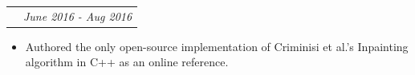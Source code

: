\documentclass[letterpaper,10pt]{article}
\makeatletter
\newcommand{\resitem}[1]{\item #1 \vspace{0pt}}
\newcommand{\ressubheading}[4]{
\begin{tabular*}{7in}{l@{\extracolsep{\fill}}r}
		\textbf{#1} #2 & \textit{#4} \\
\end{tabular*}\vspace{0pt}}
\newcommand{\resprojectsubheading}[2]{
\begin{tabular*}{7in}{l@{\extracolsep{\fill}}r}
        \textbf{#1} & \textit{#2} \\
\end{tabular*}\vspace{0pt}}
\newcommand{\MYhref}[3][blue]{\href{#2}{\color{#1}{\underline{#3}}}}%
\makeatother
\begin{document}


	




   \resprojectsubheading{\textbf{\MYhref{https://github.com/sooham/inpainting}{Image Inpainting C++ Library}}}{June 2016 - Aug 2016}
	\begin{itemize} \vspace{-\topsep}
    \setlength{\parskip}{0pt}
    \setlength{\itemsep}{0pt plus 1pt}

    \resitem{Authored the only open-source implementation of Criminisi et al.'s Inpainting algorithm in C++ as an online reference.}
    \end{itemize}




\end{document}
